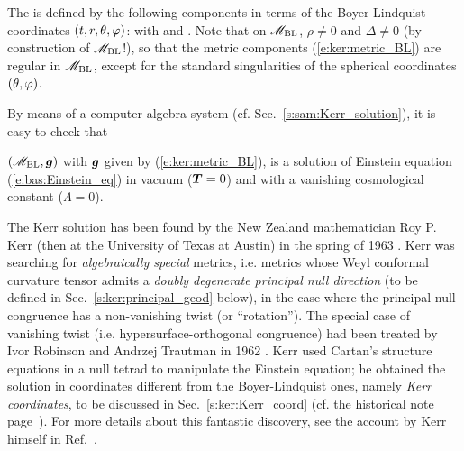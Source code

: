 The  is defined by the following
components in terms of the Boyer-Lindquist coordinates $(t,r,\theta,\varphi)$:
\be \label{e:ker:metric_BL}
\ee
with
\be \label{e:ker:def_rho2}
\ee
and
\be \label{e:ker:def_Delta}
     .
\ee
Note that on $\mathscr{M}_{\rm BL}$, $\rho\not=0$ and $\Delta\not=0$ (by construction
of $\mathscr{M}_{\rm BL}$!), so that the metric components (\ref{e:ker:metric_BL})
are regular in $\mathscr{M}_{\rm BL}$, except for the standard singularities of
the spherical coordinates $(\theta,\varphi)$.

By means of a computer algebra system (cf. Sec.~\ref{s:sam:Kerr_solution}),
it is easy to check that
\begin{greybox}
$\left(\mathscr{M}_{\rm BL},\bm{g}\right)$ with $\bm{g}$ given
by (\ref{e:ker:metric_BL}), is a solution of Einstein equation (\ref{e:bas:Einstein_eq})
in vacuum ($\bm{T}=0$) and with a vanishing cosmological constant ($\Lambda=0$).
\end{greybox}

\begin{hist}
The Kerr solution has been found by the New Zealand mathematician Roy P. Kerr (then at the University of Texas at Austin) in the spring of 1963
\cite{Kerr63}. Kerr was searching for \emph{algebraically special} metrics, i.e. metrics whose Weyl conformal curvature
tensor admits a \emph{doubly degenerate principal null direction} (to be defined
in Sec.~\ref{s:ker:principal_geod} below), in the case where the
principal null congruence has a non-vanishing twist (or ``rotation''). The special case of vanishing twist (i.e. hypersurface-orthogonal
congruence) had been treated by Ivor Robinson and
Andrzej Trautman in 1962 \cite{RobinT62}.
Kerr used
Cartan's structure equations in a null tetrad
to manipulate the Einstein equation; he obtained the solution in coordinates different from the Boyer-Lindquist ones, namely \emph{Kerr coordinates},
to be discussed in Sec.~\ref{s:ker:Kerr_coord} (cf. the historical note page~\pageref{h:ker:Kerr_coord}). For more details about this fantastic discovery, see the
account by Kerr himself in Ref.~\cite{Kerr09}.
\end{hist}

